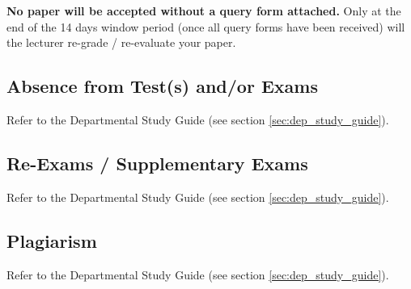             \textbf{No paper will be accepted without a query form attached.}
            Only at the end of the 14 days window period (once all query forms
            have been received) will the lecturer re-grade / re-evaluate your
            paper.

    \subsection{Absence from Test(s) and/or Exams}
        Refer to the Departmental Study Guide
        (see section \ref{sec:dep_study_guide}).

    \subsection{Re-Exams / Supplementary Exams}
        Refer to the Departmental Study Guide
        (see section \ref{sec:dep_study_guide}).

    \subsection{Plagiarism}
        Refer to the Departmental Study Guide
        (see section \ref{sec:dep_study_guide}).

